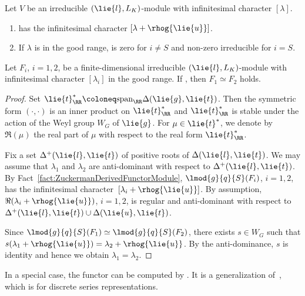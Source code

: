 \begin{Fact}\label{fact:ZuckermanDerivedFunctorModule}
	Let $V$ be an irreducible $(\lie{l}, L_K)$-module with infinitesimal character $[\lambda]$.
	\begin{enumerate}\itemsep=0pt
		\item[$1.$]  has the infinitesimal character $[\lambda+\rhog{\lie{u}}]$.
		\item[$2.$] If $\lambda$ is in the good range,  is zero for $i\neq S$
		and non-zero irreducible for $i=S$.
	\end{enumerate}
\end{Fact}

\begin{Proposition}\label{prop:UniqueZuckermanModule}
	Let $F_i$, $i=1,2$, be a finite-dimensional irreducible $(\lie{l}, L_K)$-module with infinitesimal character $[\lambda_i]$ in the good range.
	If , then $F_1 \simeq F_2$ holds.
\end{Proposition}

\begin{proof}
	Set $\lie{t}^*_\RR\coloneq \mathrm{span}_{\RR}\Delta(\lie{g}, \lie{t})$.
	Then the symmetric form $(\cdot, \cdot)$ is an inner product on $\lie{t}^*_\RR$
	and $\lie{t}^*_\RR$ is stable under the action of the Weyl group $W_G$ of $\lie{g}$.
	For $\mu \in \lie{t}^*$, we denote by $\Re(\mu)$ the real part of $\mu$ with respect to the real form $\lie{t}^*_\RR$.

	Fix a set $\Delta^+(\lie{l}, \lie{t})$ of positive roots of $\Delta(\lie{l}, \lie{t})$.
	We may assume that $\lambda_1$ and $\lambda_2$ are anti-dominant with respect to $\Delta^+(\lie{l}, \lie{t})$.
	By Fact~\ref{fact:ZuckermanDerivedFunctorModule}, $\lmod{g}{q}{S}(F_i)$, $i=1,2$, has the infinitesimal character~$[\lambda_i + \rhog{\lie{u}}]$.
	By assumption, $\Re(\lambda_i + \rhog{\lie{u}})$, $i = 1,2$, is regular and anti-dominant with respect to~${\Delta^+(\lie{l}, \lie{t}) \cup \Delta(\lie{u}, \lie{t})}$.

	Since $\lmod{g}{q}{S}(F_1) \simeq \lmod{g}{q}{S}(F_2)$, there exists $s \in W_G$ such that $s(\lambda_1 + \rhog{\lie{u}}) = \lambda_2 + \rhog{\lie{u}}$.
	By the anti-dominance, $s$ is identity and hence we obtain $\lambda_1 = \lambda_2$.
\end{proof}

In a special case, the functor  can be computed by .
It is a generalization of~\cite[Lemma~7]{GrWa00}, which is for discrete series representations.

